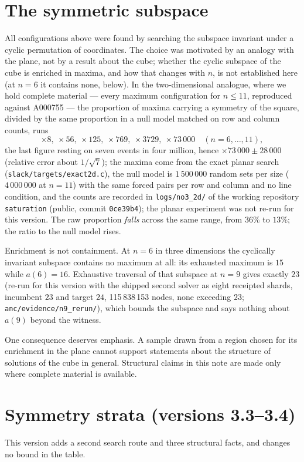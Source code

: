 \documentclass[11pt,a4paper]{article}
\begin{document}
\section{The symmetric subspace}\label{s:subspace}
All configurations above were found by searching the subspace invariant under a cyclic
permutation of coordinates.  The choice was motivated by an analogy with the plane, not by a
result about the cube; whether the cyclic subspace of the cube is enriched in maxima, and how that
changes with $n$, is not established here (at $n=6$ it contains none, below).  In the two-dimensional
analogue, where we hold complete material --- every maximum
configuration for $n\le11$, reproduced against A000755 --- the proportion of maxima carrying a
symmetry of the square, divided by the same proportion in a null model matched on row and column
counts, runs
\[\times8,\ \times56,\ \times125,\ \times769,\ \times3729,\ \times73\,000\quad (n=6,\dots,11),\]
the last figure resting on seven events in four million, hence $\times73\,000\pm28\,000$ (relative error about $1/\sqrt7$);
the maxima come from the exact planar search (\texttt{slack/targets/exact2d.c}), the null model is $1\,500\,000$ random sets per size
($4\,000\,000$ at $n=11$) with the same forced pairs per row and column and no line condition, and the counts are recorded in
\texttt{logs/no3\_2d/} of the working repository \texttt{saturation} (public, commit \texttt{0ce39b4}); the planar experiment was not re-run for this version.  The raw proportion \emph{falls} across the same range, from $36\%$ to $13\%$; the
ratio to the null model rises.

Enrichment is not containment.  At $n=6$ in three dimensions the cyclically invariant subspace
contains no maximum at all: its exhausted maximum is $15$ while $a(6)=16$.  Exhaustive traversal
of that subspace at $n=9$ gives exactly $23$ (re-run for this version with the shipped second solver as eight receipted shards, incumbent $23$ and target $24$, 115\,838\,153 nodes, none exceeding $23$; \texttt{anc/evidence/n9\_rerun/}), which bounds the subspace and says nothing about
$a(9)$ beyond the witness.

One consequence deserves emphasis.  A sample drawn from a region chosen for its enrichment in the
plane cannot support statements about the structure of solutions of the cube in general.  Structural
claims in this note are made only where complete material is available.

\section{Symmetry strata (versions 3.3--3.4)}\label{s:strata}
This version adds a second search route and three structural facts, and changes no bound in the
table.
\end{document}

